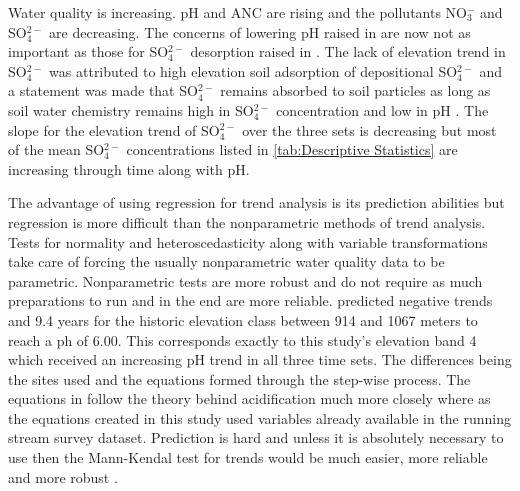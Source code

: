 Water quality is increasing.  
pH and ANC are rising and the pollutants NO$_3^-$ and SO$_4^{2-}$ are decreasing.  
The concerns of lowering pH raised in \citet{robinson2008ph} are now not as important as those for SO$_4^{2-}$ desorption raised in \citet{cai2012}.  
The lack of elevation trend in SO$_4^{2-}$ was attributed to high elevation soil adsorption of depositional SO$_4^{2-}$ and a statement was made that SO$_4^{2-}$ remains absorbed to soil particles as long as soil water chemistry remains high in SO$_4^{2-}$ concentration and low in pH \citep{cai2011long}.  
The slope for the elevation trend of SO$_4^{2-}$ over the three sets is decreasing but most of the mean SO$_4^{2-}$ concentrations listed in \autoref{tab:Descriptive Statistics} are increasing through time along with pH.

The advantage of using regression for trend analysis is its prediction abilities but regression is more difficult than the nonparametric methods of trend analysis. 
 Tests for normality and heteroscedasticity along with variable transformations take care of forcing the usually nonparametric water quality data to be parametric.  
Nonparametric tests are more robust and do not require as much preparations to run and in the end are more reliable.  \citet{robinson2008ph} predicted negative trends and 9.4 years for the historic elevation class between 914 and 1067 meters to reach a ph of 6.00.  
This corresponds exactly to this study's elevation band 4 which received an increasing pH trend in all three time sets.  
The differences being the sites used and the equations formed through the step-wise process.  
The equations in \citet{robinson2008ph} follow the theory behind acidification much more closely where as the equations created in this study used variables already  available in the running stream survey dataset.  
Prediction is hard and unless it is absolutely necessary to use then the Mann-Kendal test for trends would be much easier, more reliable and more robust \citep{helsel1992statistical}.      
